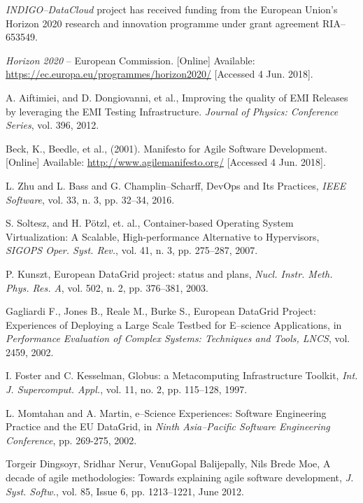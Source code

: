 \documentclass[journal]{IEEEtran}
\begin{document}
{\sl INDIGO--DataCloud} project has received funding from the European Union's Horizon
2020 research and innovation programme under grant agreement RIA--653549.

\begin{thebibliography}{1}

\emph{Horizon 2020} -- European Commission.
[Online] Available: \url{https://ec.europa.eu/programmes/horizon2020/}
[Accessed 4 Jun. 2018].

A. Aiftimiei, and D. Dongiovanni, et al.,
Improving the quality of EMI Releases by leveraging the
EMI Testing Infrastructure.
\emph{Journal of Physics: Conference Series},
vol. 396, 2012.

Beck, K., Beedle, et al., (2001).
Manifesto for Agile Software Development.
[Online] Available: \url{http://www.agilemanifesto.org/}
[Accessed 4 Jun. 2018].

L. Zhu and L. Bass and G. Champlin--Scharff,
DevOps and Its Practices,
\emph{IEEE Software},
vol. 33, n. 3, pp. 32--34, 2016.

S. Soltesz, and H. P\"{o}tzl, et. al.,
Container-based Operating System Virtualization: A Scalable, High-performance Alternative to Hypervisors,
\emph{SIGOPS Oper. Syst. Rev.},
vol. 41, n. 3, pp. 275--287, 2007.

P. Kunszt,
European DataGrid project: status and plans,
\emph{Nucl. Instr. Meth. Phys. Res. A},
vol. 502, n. 2, pp. 376--381, 2003.

Gagliardi F., Jones B., Reale M., Burke S.,
European DataGrid Project: Experiences of Deploying a Large Scale Testbed for E--science Applications,
in \emph{Performance Evaluation of Complex Systems: Techniques and Tools, LNCS},
vol. 2459, 2002.

I. Foster and C. Kesselman,
Globus: a Metacomputing Infrastructure Toolkit,
\emph{Int. J. Supercomput. Appl.},
vol. 11, no. 2, pp. 115--128, 1997.

L. Momtahan and A. Martin,
e--Science Experiences: Software Engineering Practice and the EU DataGrid,
in \emph{Ninth Asia--Pacific Software Engineering Conference},
pp. 269-275, 2002.

Torgeir Dingsoyr, Sridhar Nerur, VenuGopal Balijepally, Nils Brede Moe,
A decade of agile methodologies: Towards explaining agile software development,
\emph{J. Syst. Softw.},
vol. 85, Issue 6, pp. 1213--1221, June 2012.


\end{thebibliography}
\end{document}
